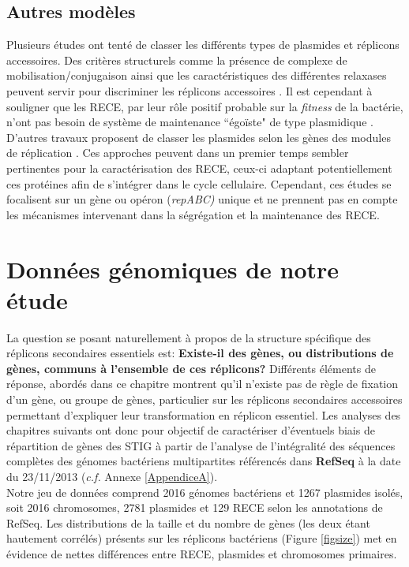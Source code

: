    
\subsection{Autres modèles}\label{parmodelepl}
	Plusieurs études ont tenté de classer les différents types de plasmides et réplicons accessoires. Des critères structurels comme la présence de complexe de mobilisation/conjugaison ainsi que les caractéristiques des différentes relaxases peuvent servir pour discriminer les réplicons accessoires \citep{garcillan2009diversity}. Il est cependant à souligner que les RECE, par leur rôle positif probable sur la \textit{fitness} de la bactérie, n'ont pas besoin de système de maintenance ``égoïste" de type plasmidique \citep{Smillie2010}. D'autres travaux proposent de classer les plasmides selon les gènes des modules de réplication \citep{jensen2010classification,Petersen2011}. Ces approches peuvent dans un premier temps sembler pertinentes pour la caractérisation des RECE, ceux-ci adaptant potentiellement ces protéines afin de s'intégrer dans le cycle cellulaire. Cependant, ces études se focalisent sur un gène ou opéron (\textit{repABC)} unique et ne prennent pas en compte les mécanismes intervenant dans la ségrégation et la maintenance des RECE. 
   


\section{Données génomiques de notre étude}   
	La question se posant naturellement à propos de la structure spécifique des réplicons secondaires essentiels est: \textbf{Existe-il des gènes, ou distributions de gènes, communs à l'ensemble de ces réplicons?} Différents éléments de réponse, abordés dans ce chapitre montrent qu'il n'existe pas de règle de fixation d'un gène, ou groupe de gènes, particulier sur les réplicons secondaires accessoires permettant d'expliquer leur transformation en réplicon essentiel. Les analyses des chapitres suivants ont donc pour objectif de caractériser d'éventuels biais de répartition de gènes des STIG à partir de l'analyse de l'intégralité des séquences complètes des génomes bactériens multipartites référencés dans \textbf{RefSeq} \citep{pruitt2007ncbi} à la date du 23/11/2013 (\textit{c.f.} Annexe \ref{AppendiceA}). \\
       Notre jeu de données comprend 2016 génomes bactériens et 1267 plasmides isolés, soit 2016 chromosomes, 2781 plasmides et 129 RECE selon les annotations de RefSeq. Les distributions de la taille et du nombre de gènes (les deux étant hautement corrélés) présents sur les réplicons bactériens (Figure \ref{figsize}) met en évidence de nettes différences entre RECE, plasmides et chromosomes primaires. 


